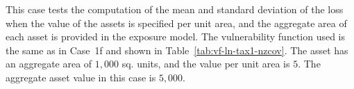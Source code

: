 This case tests the computation of the mean and standard deviation of the loss when the value of the assets is specified per unit area, and the aggregate area of each asset is provided in the exposure model. The vulnerability function used is the same as in Case~1f and shown in Table~\ref{tab:vf-ln-tax1-nzcov}. The asset has an aggregate area of $1,000$ sq. units, and the value per unit area is $5$. The aggregate asset value in this case is $5,000$.